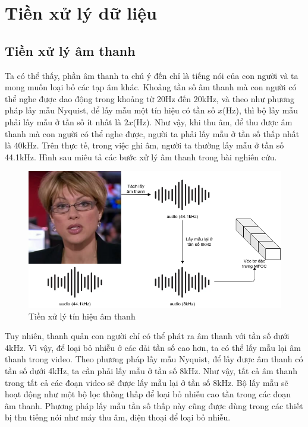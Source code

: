 \section{Tiền xử lý dữ liệu}

\subsection{Tiền xử lý âm thanh}
Ta có thể thấy, phần âm thanh ta chú ý đến chỉ là tiếng nói của con người và ta mong muốn loại bỏ các tạp âm khác. Khoảng tần số âm thanh mà con người có thể nghe được dao động trong khoảng từ 20Hz đến 20kHz, và theo như phương pháp lấy mẫu Nyquist, để lấy mẫu một tín hiệu có tần số $x$(Hz), thì bộ lấy mẫu phải lấy mẫu ở tần số ít nhất là $2x$(Hz). Như vậy, khi thu âm, để thu được âm thanh mà con người có thể nghe được, người ta phải lấy mẫu ở tần số thấp nhất là 40kHz. Trên thực tế, trong việc ghi âm, người ta thường lấy mẫu ở tần số 44.1kHz. Hình sau miêu tả các bước xử lý âm thanh trong bài nghiên cứu.

\begin{figure}[H]
    \centering
    \includegraphics[width=12cm]{./content/materials/preprocess-audio.png}
    \caption{Tiền xử lý tín hiệu âm thanh}
\end{figure}

Tuy nhiên, thanh quản con người chỉ có thể phát ra âm thanh với tần số dưới 4kHz. Vì vậy, để loại bỏ nhiễu ở các dải tần số cao hơn, ta có thể lấy mẫu lại âm thanh trong video. Theo phương pháp lấy mẫu Nyquist, để lấy được âm thanh có tần số dưới 4kHz, ta cần phải lấy mẫu ở tần số 8kHz. Như vậy, tất cả âm thanh trong tất cả các đoạn video sẽ được lấy mẫu lại ở tần số 8kHz. Bộ lấy mẫu sẽ hoạt động như một bộ lọc thông thấp để loại bỏ nhiễu cao tần trong các đoạn âm thanh. Phương pháp lấy mẫu tần số thấp này cũng được dùng trong các thiết bị thu tiếng nói như máy thu âm, điện thoại để loại bỏ nhiễu.

